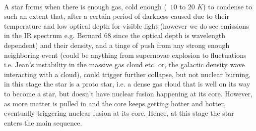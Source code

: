 \documentclass[a4paper,twoside]{report}
\numberwithin{equation}{section}
\begin{document}
\paragraph{}
A star forms when there is enough gas, cold enough (~$10$ to $20$ $K$) to condense to such an extent that, after a certain period of darkness caused due to their temperature and low optical depth for visible light (however we do see emissions in the IR spectrum e.g. Bernard $68$ since the optical depth is wavelength dependent) and their density, and a tinge of push from any strong enough neighboring event (could be anything from supernovae explosion to fluctuations i.e. Jean's instability in the massive gas cloud etc. or, the galactic density wave interacting with a cloud), could trigger further collapse, but not nuclear burning, in this stage the star is a proto star, i.e. a dense gas cloud that is well on its way to become a star, but doesn't have nuclear fusion happening at its core. However, as more matter is pulled in and the core keeps getting hotter and hotter, eventually triggering nuclear fusion at its core. Hence, at this stage the star enters the main sequence. 
\end{document}
